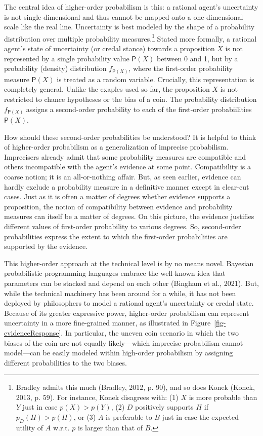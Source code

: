 \documentclass[
  letterpaper,
  DIV=11,
  numbers=noendperiod]{scrartcl}
\begin{document}
The central idea of higher-order probabilism is this: a rational agent's
uncertainty is not single-dimensional and thus cannot be mapped onto a
one-dimensional scale like the real line. Uncertainty is best modeled by
the shape of a probability distribution over multiple probability
measures.\footnote{Bradley admits this much (Bradley, 2012, p. 90), and
  so does Konek (Konek, 2013, p. 59). For instance, Konek disagrees
  with: (1) \(X\) is more probable than \(Y\) just in case
  \(p(X)>p(Y)\), (2) \(D\) positively supports \(H\) if
  \(p_D(H)> p(H)\), or (3) \(A\) is preferable to \(B\) just in case the
  expected utility of \(A\) w.r.t. \(p\) is larger than that of \(B\).}
Stated more formally, a rational agent's state of uncertainty (or credal
stance) towards a proposition \(X\) is not represented by a single
probability value \(\mathsf{P}(X)\) between 0 and 1, but by a
probability (density) distribution \(f_{\mathsf{P}(X)}\), where the
first-order probability measure \(\mathsf{P}(X)\) is treated as a random
variable. Crucially, this representation is completely general. Unlike
the exaples used so far, the proposition \(X\) is not restricted to
chance hypotheses or the bias of a coin. The probability distribution
\(f_{\mathsf{P}(X)}\) assigns a second-order probability to each of the
first-order probabiilities \(\mathsf{P}(X)\).

How should these second-order probabilities be understood? It is helpful
to think of higher-order probabilism as a generalization of imprecise
probabilism. Imprecisers already admit that some probability measures
are compatible and others incompatible with the agent's evidence at some
point. Compatibility is a coarse notion; it is an all-or-nothing affair.
But, as seen earlier, evidence can hardly exclude a probability measure
in a definitive manner except in clear-cut cases. Just as it is often a
matter of degrees whether evidence supports a proposition, the notion of
compatibility between evidence and probability measures can itself be a
matter of degrees. On this picture, the evidence justifies different
values of first-order probability to various degrees. So, second-order
probabilities express the extent to which the first-order probabilities
are supported by the evidence.

This higher-order approach at the technical level is by no means novel.
Bayesian probabilistic programming languages embrace the well-known idea
that parameters can be stacked and depend on each other (Bingham et al.,
2021). But, while the technical machinery has been around for a while,
it has not been deployed by philosophers to model a rational agent's
uncertainty or credal state. Because of its greater expressive power,
higher-order probabilism can represent uncertainty in a more
fine-grained manner, as illustrated in
Figure~\ref{fig-evidenceResponse}. In particular, the uneven coin
scenario in which the two biases of the coin are not equally
likely---which imprecise probabilism cannot model---can be easily
modeled within high-order probabilism by assigning different
probabilities to the two biases.
\end{document}
